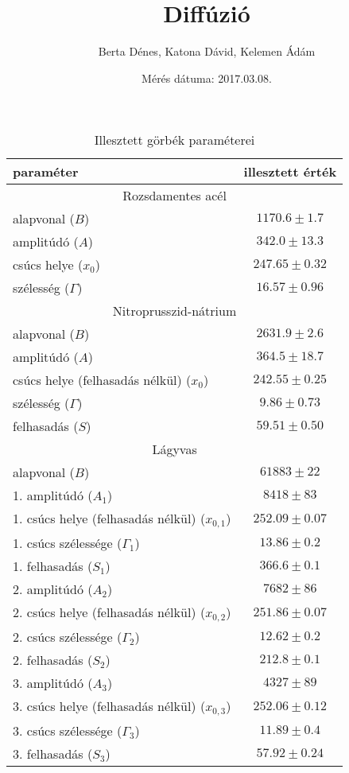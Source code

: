 \documentclass[a4paper,12pt]{article}
\title{Diffúzió}
\author{Berta Dénes, Katona Dávid, Kelemen Ádám}
\date{Mérés dátuma: 2017.03.08.}
\begin{document}
\begin{table}[h]
	\begin{center}
	\begin{tabular}{|l|c|}
		\hline
		\textbf{paraméter} & \textbf{illesztett érték} \\
		\hline

		\hline
		\multicolumn{2}{c}{Rozsdamentes acél} \\
		\hline
		alapvonal ($B$) & $1170.6 \pm 1.7 $\\
		\hline
		amplitúdó ($A$) & $342.0 \pm 13.3 $\\
		\hline
		csúcs helye ($x_0$) & $247.65 \pm 0.32$\\
		\hline
		szélesség ($\Gamma$) & $16.57 \pm 0.96$\\
		\hline

		\hline
		\multicolumn{2}{c}{Nitroprusszid-nátrium} \\
		\hline
		alapvonal ($B$) & $2631.9 \pm 2.6 $\\
		\hline
		amplitúdó ($A$) & $364.5 \pm 18.7 $\\
		\hline
		csúcs helye (felhasadás nélkül) ($x_0$) & $242.55 \pm 0.25$\\
		\hline
		szélesség ($\Gamma$) & $9.86 \pm 0.73$\\
		\hline
		felhasadás ($S$) & $59.51 \pm 0.50$ \\
		\hline

		\hline
		\multicolumn{2}{c}{Lágyvas} \\
		\hline
		alapvonal ($B$) & $61883 \pm 22 $\\
		\hline
		1. amplitúdó ($A_1$) & $8418 \pm 83 $\\
		\hline
		1. csúcs helye (felhasadás nélkül) ($x_{0, 1}$) & $252.09 \pm 0.07$\\
		\hline
		1. csúcs szélessége ($\Gamma_1$) & $13.86 \pm 0.2$\\
		\hline
		1. felhasadás ($S_1$) & $366.6 \pm 0.1$ \\
		\hline
		2. amplitúdó ($A_2$) & $7682 \pm 86 $\\
		\hline
		2. csúcs helye (felhasadás nélkül) ($x_{0, 2}$) & $251.86\pm 0.07$\\
		\hline
		2. csúcs szélessége ($\Gamma_2$) & $12.62 \pm 0.2 $\\
		\hline
		2. felhasadás ($S_2$) & $212.8 \pm 0.1$ \\
		\hline
		3. amplitúdó ($A_3$) & $4327 \pm 89 $\\
		\hline
		3. csúcs helye (felhasadás nélkül) ($x_{0, 3}$) & $252.06 \pm 0.12$\\
		\hline
		3. csúcs szélessége ($\Gamma_3$) & $11.89 \pm 0.4$\\
		\hline
		3. felhasadás ($S_3$) & $57.92 \pm 0.24$ \\
		\hline



	\end{tabular}
	\end{center}
	\caption{Illesztett görbék paraméterei}
	\label{tab:params}
\end{table}

	
\end{document}
